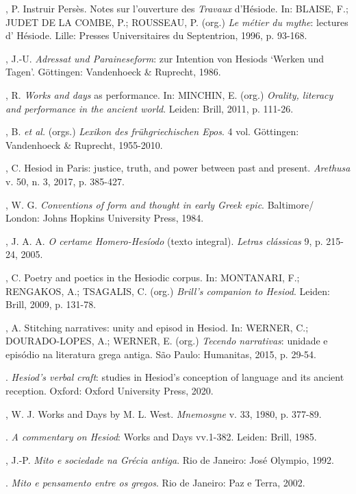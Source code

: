 \begin{bibliohedra}
, P. Instruir Persès. Notes sur l'ouverture des \emph{Travaux}
d'Hésiode. In: BLAISE, F.; JUDET DE LA COMBE, P.; ROUSSEAU, P. (org.)
\emph{Le métier du mythe}: lectures d' Hésiode. Lille: Presses
Universitaires du Septentrion, 1996, p. 93-168.

, J.-U. \emph{Adressat und Paraineseform}: zur Intention von
Hesiods `Werken und Tagen'. Göttingen: Vandenhoeck \& Ruprecht, 1986.

, R. \emph{Works and days} as performance. In: MINCHIN, E. (org.)
\emph{Orality, literacy and performance in the ancient world}. Leiden:
Brill, 2011, p. 111-26.

, B. \emph{et al.} (orgs.) \emph{Lexikon des frühgriechischen
Epos}. 4 vol. Göttingen: Vandenhoeck \& Ruprecht, 1955-2010.

, C. Hesiod in Paris: justice, truth, and power between past and
present. \emph{Arethusa} v. 50, n. 3, 2017, p. 385-427.

, W. G. \emph{Conventions of form and thought in early Greek
epic}. Baltimore/ London: Johns Hopkins University Press, 1984.

, J. A. A. \emph{O certame Homero-Hesíodo} (texto integral).
\emph{Letras clássicas} 9, p. 215-24, 2005.

, C. Poetry and poetics in the Hesiodic corpus. In: MONTANARI,
F.; RENGAKOS, A.; TSAGALIS, C. (org.) \emph{Brill's companion to
Hesiod}. Leiden: Brill, 2009, p. 131-78.

, A. Stitching narratives: unity and episod in Hesiod. In:
WERNER, C.; DOURADO-LOPES, A.; WERNER, E. (org.) \emph{Tecendo
narrativas}: unidade e episódio na literatura grega antiga. São Paulo:
Humanitas, 2015, p. 29-54.

\titidem. \emph{Hesiod's verbal craft}: studies in Hesiod's conception of
language and its ancient reception. Oxford: Oxford University Press,
2020.

, W. J. Works and Days by M. L. West. \emph{Mnemosyne} v. 33,
1980, p. 377-89.

\titidem. \emph{A commentary on Hesiod}: Works and Days vv.1-382. Leiden:
Brill, 1985.

, J.-P. \emph{Mito e sociedade na Grécia antiga}. Rio de Janeiro:
José Olympio, 1992.

\titidem. \emph{Mito e pensamento entre os gregos}. Rio de Janeiro: Paz e
Terra, 2002.


\end{bibliohedra}
